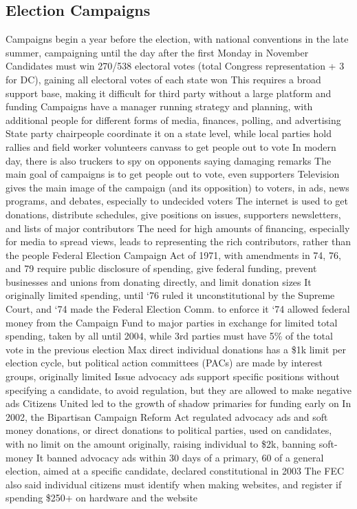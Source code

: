 \documentclass[11 pt, twoside]{article}
\newenvironment{outline*}
{
	\begin{outline}[enumerate]
	}
	{\end{outline}
}
\begin{document}
\subsection{Election Campaigns}
\begin{outline*}
\1 Campaigns begin a year before the election, with national conventions in the late summer, campaigning until the day after the first Monday in November
\2 Candidates must win 270/538 electoral votes (total Congress representation + 3 for DC), gaining all electoral votes of each state won
\2 This requires a broad support base, making it difficult for third party without a large platform and funding
\1 Campaigns have a manager running strategy and planning, with additional people for different forms of media, finances, polling, and advertising
\2 State party chairpeople coordinate it on a state level, while local parties hold rallies and field worker volunteers canvass to get people out to vote
\2 In modern day, there is also truckers to spy on opponents saying damaging remarks
\2 The main goal of campaigns is to get people out to vote, even supporters
\1 Television gives the main image of the campaign (and its opposition) to voters, in ads, news programs, and debates, especially to undecided voters
\2 The internet is used to get donations, distribute schedules, give positions on issues, supporters newsletters, and lists of major contributors
\1 The need for high amounts of financing, especially for media to spread views, leads to representing the rich contributors, rather than the people
\2 Federal Election Campaign Act of 1971, with amendments in 74, 76, and 79 require public disclosure of spending, give federal funding, prevent businesses and unions from donating directly, and limit donation sizes
\2 It originally limited spending, until ‘76 ruled it unconstitutional by the Supreme Court, and ‘74 made the Federal Election Comm. to enforce it
\2 ‘74 allowed federal money from the Campaign Fund to major parties in exchange for limited total spending, taken by all until 2004, while 3rd parties must have 5\% of the total vote in the previous election
\1 Max direct individual donations has a \$1k limit per election cycle, but political action committees (PACs) are made by interest groups, originally limited
\2 Issue advocacy ads support specific positions without specifying a candidate, to avoid regulation, but they are allowed to make negative ads
\2 Citizens United led to the growth of shadow primaries for funding early on
\1 In 2002, the Bipartisan Campaign Reform Act regulated advocacy ads and soft money donations, or direct donations to political parties, used on candidates, with no limit on the amount originally, raising individual to \$2k, banning soft-money
\2 It banned advocacy ads within 30 days of a primary, 60 of a general election, aimed at a specific candidate, declared constitutional in 2003
\2 The FEC also said individual citizens must identify when making websites, and register if spending \$250+ on hardware and the website
\end{outline*}
\end{document}
